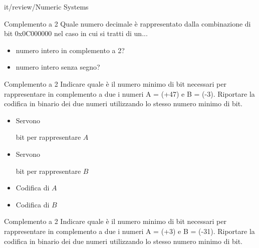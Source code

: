 \documentclass[11pt]{article}
\begin{document}
\begin{quiz}{it/review/Numeric Systems}
\begin{cloze}[points=1,shuffle=false]{Complemento a 2}
Quale numero decimale è rappresentato dalla combinazione di bit 0x0C000000 nel caso in cui si tratti di un...
\begin{itemize}
\item numero intero in complemento a 2? 
\item numero intero senza segno? 
\end{itemize}
\end{cloze}


\begin{cloze}[points=1,shuffle=false]{Complemento a 2}
Indicare quale \`{e} il numero minimo di bit necessari per rappresentare in complemento a due i numeri A = (+47) e B = (-3). Riportare la codifica in binario dei due numeri utilizzando lo stesso numero minimo di bit.

\begin{itemize}
\item Servono  bit per rappresentare $A$
\item Servono  bit per rappresentare $B$
\item Codifica di $A$ 
\item Codifica di $B$ 
\end{itemize}
\end{cloze}

\begin{cloze}[points=1,shuffle=false]{Complemento a 2}
Indicare quale \`{e} il numero minimo di bit necessari per rappresentare in complemento a due i numeri A = (+3) e B = (-31). Riportare la codifica in binario dei due numeri utilizzando lo stesso numero minimo di bit.


\end{cloze}
\end{quiz}
\end{document}
